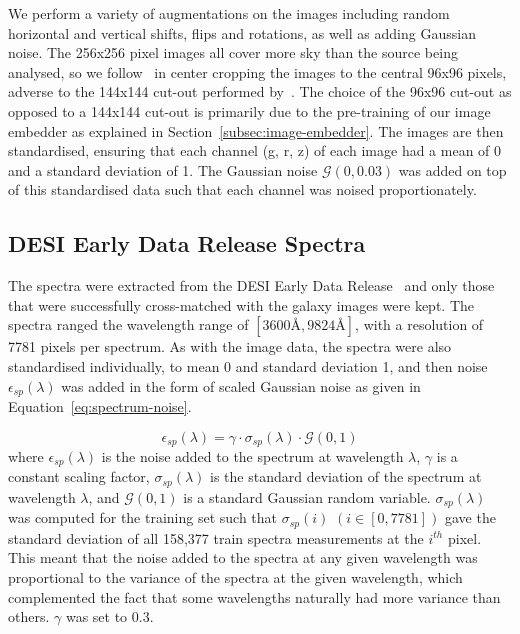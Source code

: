 We perform a variety of augmentations on the images including random horizontal and vertical shifts, flips and rotations,
as well as adding Gaussian noise.
The 256x256 pixel images all cover more sky than the source being analysed, so we follow~\cite{stein2022} in center
cropping the images to the central 96x96 pixels, adverse to the 144x144 cut-out performed by~\cite{astroclip}.
The choice of the 96x96 cut-out as opposed to a 144x144 cut-out is primarily due to the pre-training of our image embedder
as explained in Section~\eqref{subsec:image-embedder}.
The images are then standardised, ensuring that each channel (g, r, z) of each image had a mean
of 0 and a standard deviation of 1.
The Gaussian noise $\mathcal{G}(0, 0.03)$ was added on top of this standardised data such that each channel was noised
proportionately.


\subsection{DESI Early Data Release Spectra}\label{subsec:spectra}
The spectra were extracted from the DESI Early Data Release~\citep{desiearly2023} and only those that were successfully
cross-matched with the galaxy images were kept.
The spectra ranged the wavelength range of $[3600 \si{\angstrom}, 9824 \si{\angstrom}]$, with a resolution of 7781 pixels per spectrum.
As with the image data, the spectra were also standardised individually, to mean 0 and standard deviation 1, and then
noise $\epsilon_{sp}(\lambda)$ was added in the form of scaled Gaussian noise as given in Equation~\eqref{eq:spectrum-noise}.

\begin{equation}
\label{eq:spectrum-noise}
    \epsilon_{sp}(\lambda) = \gamma \cdot \sigma_{sp}(\lambda) \cdot \mathcal{G}(0, 1)
\end{equation}
where $\epsilon_{sp}(\lambda)$ is the noise added to the spectrum at wavelength $\lambda$, $\gamma$ is a constant scaling factor,
$\sigma_{sp}(\lambda)$ is the standard deviation of the spectrum at wavelength $\lambda$,
and $\mathcal{G}(0, 1)$ is a standard Gaussian random variable.
$\sigma_{sp}(\lambda)$ was computed for the training set such that $\sigma_{sp}(i)$ $(i \in [0, 7781])$ gave the standard
deviation of all 158,377 train spectra measurements at the $i^{th}$ pixel.
This meant that the noise added to the spectra at any given wavelength was proportional to the variance of the spectra
at the given wavelength, which complemented the fact that some wavelengths naturally had more variance than others.
$\gamma$ was set to 0.3.

